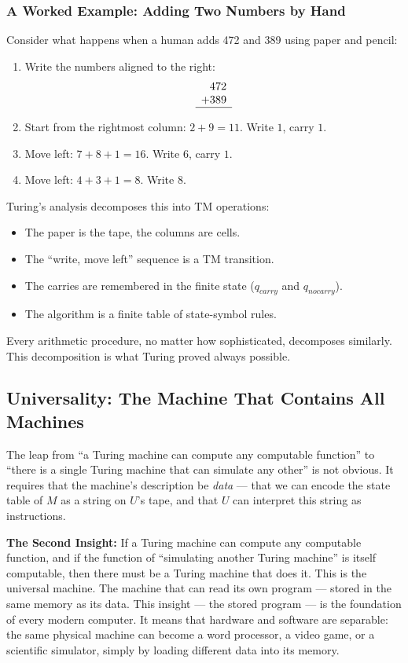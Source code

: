 \subsubsection*{A Worked Example: Adding Two Numbers by Hand}

Consider what happens when a human adds 472 and 389 using paper and pencil:

\begin{enumerate}
\item Write the numbers aligned to the right:
\[
\begin{array}{r}
  472 \\
+ 389 \\
\hline
\end{array}
\]
\item Start from the rightmost column: $2 + 9 = 11$. Write $1$, carry $1$.
\item Move left: $7 + 8 + 1 = 16$. Write $6$, carry $1$.
\item Move left: $4 + 3 + 1 = 8$. Write $8$.
\end{enumerate}

Turing's analysis decomposes this into TM operations:
\begin{itemize}
\item The paper is the tape, the columns are cells.
\item The ``write, move left'' sequence is a TM transition.
\item The carries are remembered in the finite state ($q_{carry}$ and $q_{nocarry}$).
\item The algorithm is a finite table of state-symbol rules.
\end{itemize}

Every arithmetic procedure, no matter how sophisticated, decomposes similarly. This decomposition is what Turing proved always possible.

\subsection*{Universality: The Machine That Contains All Machines}

The leap from ``a Turing machine can compute any computable function'' to ``there is a single Turing machine that can simulate any other'' is not obvious. It requires that the machine's description be \emph{data} --- that we can encode the state table of $M$ as a string on $U$'s tape, and that $U$ can interpret this string as instructions.

\textbf{The Second Insight:} If a Turing machine can compute any computable function, and if the function of ``simulating another Turing machine'' is itself computable, then there must be a Turing machine that does it. This is the universal machine. The machine that can read its own program --- stored in the same memory as its data.
This insight --- the stored program --- is the foundation of every modern computer. It means that hardware and software are separable: the same physical machine can become a word processor, a video game, or a scientific simulator, simply by loading different data into its memory.

